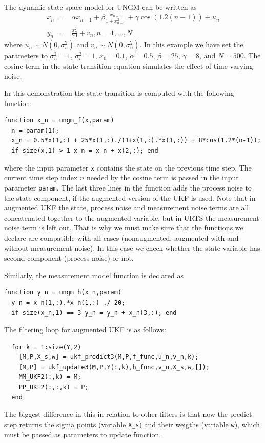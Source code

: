 The dynamic state space model for UNGM can be written as
%
\begin{eqnarray} x_n & = & \alpha x_{n-1} + \beta
\frac{x_{n-1}}{1+x_{n-1}^2} + \gamma \cos(1.2(n-1)) + u_n \\ y_n & = &
\frac{x_n^2}{20} + v_n, n = 1,\ldots,N
\end{eqnarray}
%
where $u_n \sim N(0,\sigma_u^2)$ and $v_n \sim N(0,\sigma_u^2)$. In
this example we have set the parameters to $\sigma_u^2 = 1$,
$\sigma_v^2=1$, $x_0 = 0.1$, $\alpha = 0.5$, $\beta = 25$, $\gamma =
8$, and $N=500$. The cosine term in the state transition equation
simulates the effect of time-varying noise.

In this demonstration the state transition is computed with the
following function:
%
\begin{lstlisting} 
function x_n = ungm_f(x,param) 
  n = param(1); 
  x_n = 0.5*x(1,:) + 25*x(1,:)./(1+x(1,:).*x(1,:)) + 8*cos(1.2*(n-1));
  if size(x,1) > 1 x_n = x_n + x(2,:); end
\end{lstlisting}
% 
where the input parameter \texttt{x} contains the state on the
previous time step. The current time step index $n$ needed by the
cosine term is passed in the input parameter \texttt{param}. The last
three lines in the function adds the process noise to the state
component, if the augmented version of the UKF is used. Note that in
augmented UKF the state, process noise and measurement noise terms are
all concatenated together to the augmented variable, but in URTS the
measurement noise term is left out. That is why we must make sure that
the functions we declare are compatible with all cases (nonaugmented,
augmented with and without measurement noise). In this case we check
whether the state variable has second component (process noise) or
not.

Similarly, the measurement model function is declared as
%
\begin{lstlisting} 
function y_n = ungm_h(x_n,param) 
  y_n = x_n(1,:).*x_n(1,:) ./ 20;
  if size(x_n,1) == 3 y_n = y_n + x_n(3,:); end
\end{lstlisting}
%
The filtering loop for augmented UKF is as follows:
%
\begin{lstlisting} 
  for k = 1:size(Y,2)
    [M,P,X_s,w] = ukf_predict3(M,P,f_func,u_n,v_n,k); 
    [M,P] = ukf_update3(M,P,Y(:,k),h_func,v_n,X_s,w,[]); 
    MM_UKF2(:,k) = M;
    PP_UKF2(:,:,k) = P; 
  end
\end{lstlisting}
%
The biggest difference in this in relation to other filters is that
now the predict step returns the sigma points (variable \texttt{X\_s})
and their weigths (variable \texttt{w}), which must be passed as
parameters to update function.



